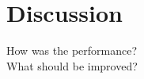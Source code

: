 \chapter{Discussion}
\label{chapter:discussion}

How was the performance? \\
What should be improved? \\